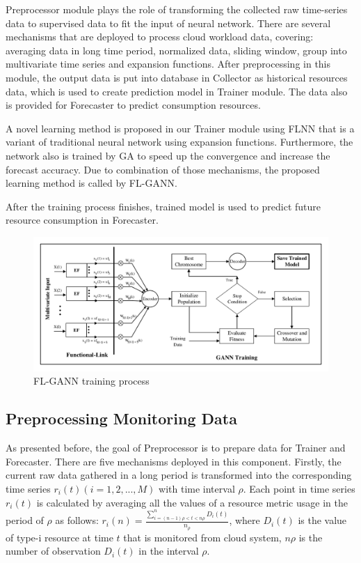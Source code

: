 \documentclass[conference]{IEEEtran}
\begin{document}
Preprocessor module plays the role of transforming the collected raw time-series data to supervised data to fit the input of neural network. There are several mechanisms that are deployed to process cloud workload data, covering: averaging data in long time period, normalized data, sliding window, group into multivariate time series and expansion functions. After preprocessing in this module, the output data is put into database in Collector as historical resources data, which is used to create prediction model in Trainer module. The data also is provided for Forecaster to predict consumption resources. 

A novel learning method is proposed in our Trainer module using FLNN that is a variant of traditional neural network using expansion functions. Furthermore, the network also is trained by GA to speed up the convergence and increase the forecast accuracy. Due to combination of those mechanisms, the proposed learning method is called by FL-GANN. 

After the training process finishes, trained model is used to predict future resource consumption in Forecaster. 

\begin{figure}[htbp]
	\centerline{\includegraphics[width=0.7\textwidth =0.1cm 0.1cm 0.1cm 0.1cm, clip]{images/FLGANN_process.pdf}}
	\caption{FL-GANN training process}
	\label{FLGANN_process}
\end{figure}

\subsection{Preprocessing Monitoring Data}
\label{pre_precessor}

As presented before, the goal of Preprocessor is to prepare data for Trainer and Forecaster. There are five mechanisms deployed in this component. Firstly, the current raw data gathered in a long period is transformed into the corresponding time series $r_i(t) (i = 1, 2,..., M)$ with time interval $\rho$. Each point in time series $r_i(t)$ is calculated by averaging all the values of a resource metric usage in the period of $\rho$ as follows: $r_i(n) = \frac{ \sum_{i=(n-1)\rho < t < n\rho}^nD_i(t) }{ n_{\rho} }$, where $D_i(t)$ is the value of type-i resource at time $t$ that is monitored from cloud system, $n\rho$ is the number of observation $D_i(t)$ in the interval $\rho$. 
\end{document}
